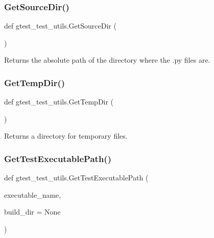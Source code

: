 \subsubsection{\texorpdfstring{Get\+Source\+Dir()}{GetSourceDir()}}
{\footnotesize\ttfamily def gtest\+\_\+test\+\_\+utils.\+Get\+Source\+Dir (\begin{DoxyParamCaption}{ }\end{DoxyParamCaption})}

\begin{DoxyVerb}Returns the absolute path of the directory where the .py files are.\end{DoxyVerb}
 \mbox{\label{namespacegtest__test__utils_a25987e1cd76e93068b2afe6bac909d12}} 
\subsubsection{\texorpdfstring{Get\+Temp\+Dir()}{GetTempDir()}}
{\footnotesize\ttfamily def gtest\+\_\+test\+\_\+utils.\+Get\+Temp\+Dir (\begin{DoxyParamCaption}{ }\end{DoxyParamCaption})}

\begin{DoxyVerb}Returns a directory for temporary files.\end{DoxyVerb}
 \mbox{\label{namespacegtest__test__utils_a89ed3717984a80ffbb7a9c92f71b86a2}} 
\subsubsection{\texorpdfstring{Get\+Test\+Executable\+Path()}{GetTestExecutablePath()}}
{\footnotesize\ttfamily def gtest\+\_\+test\+\_\+utils.\+Get\+Test\+Executable\+Path (\begin{DoxyParamCaption}\item[{}]{executable\+\_\+name,  }\item[{}]{build\+\_\+dir = {\ttfamily None} }\end{DoxyParamCaption})}


